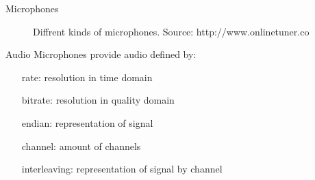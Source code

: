 \documentclass{beamer}
\begin{document}
	\begin{frame}{Microphones}
		\begin{figure}[ht]
			\centering
			\caption{Diffrent kinds of microphones. Source: http://www.onlinetuner.co}
		\end{figure}
	\end{frame}
	
	\begin{frame}{Audio}
		Microphones provide audio defined by:
		\begin{itemize}[noitemsep,topsep=0pt,parsep=0pt,partopsep=0pt]
			\setlength\itemindent{50pt}
			\item[rate:] resolution in time domain
			\item[bitrate:] resolution in quality domain
			\item[endian:] representation of signal
			\item[channel:] amount of channels 
			\item[interleaving:] representation of signal by channel
		\end{itemize}
	\end{frame}
	
\end{document}
